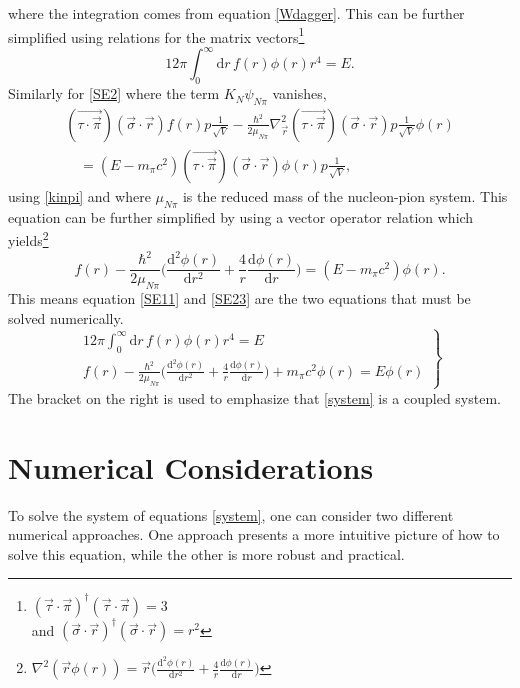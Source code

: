 where the integration comes from equation \eqref{Wdagger}. This can be further simplified using relations for the matrix vectors\footnote{$(\vec{\tau}\cdot \vec{\pi})^\dagger(\vec{\tau}\cdot \vec{\pi}) = 3$ \\ and
	$(\vec{\sigma}\cdot \vec{r})^\dagger(\vec{\sigma}\cdot \vec{r}) = r^2$}
\begin{equation} \label{SE11}
	12\pi \int_0^\infty  \text{d}r \, f(r) \phi(r) r^4  = E.
\end{equation}
Similarly for \eqref{SE2} where the term $K_{N}\psi_{N\pi}$ vanishes,
\begin{equation}\begin{split}\label{SE22}
		(\vec{\tau\cdot\vec{\pi}})(\vec{\sigma}\cdot\vec{r})f(r) p \frac{1}{\sqrt{V}}-\frac{\hbar^2}{2\mu_{N\pi}} \nabla^2_{\vec{r}}(\vec{\tau\cdot\vec{\pi}})(\vec{\sigma}\cdot\vec{r}) p \frac{1}{\sqrt{V}}\phi(r) \\ \quad= (E-m_\pi c^2) (\vec{\tau\cdot\vec{\pi}})(\vec{\sigma}\cdot\vec{r}) \phi(r)p\frac{1}{\sqrt{V}},
	\end{split}
\end{equation}
using \eqref{kinpi} and where $\mu_{N\pi}$ is the reduced mass of the nucleon-pion system. This equation can be further simplified by using a vector operator relation which yields\footnote{$\nabla^2(\vec{r}\phi(r))=\vec{r}\big(\frac{\text{d}^2\phi(r)}{\text{d}r^2}+\frac{4}{r}\frac{\text{d}\phi(r)}{\text{d}r}\big)$}
\begin{equation} \label{SE23}
	f(r) -\frac{\hbar^2}{2\mu_{N\pi}}\Big(\frac{\text{d}^2 \phi(r)}{\text{d}r^2}+\frac{4}{r}\frac{\text{d}\phi(r)}{\text{d}r}\Big) = (E-m_\pi c^2)\phi(r).
\end{equation}
This means equation \eqref{SE11} and \eqref{SE23} are the two equations that must be solved numerically.
\begin{equation} \label{system}
	\left.
	\begin{array}{ll}
		12\pi \int_0^\infty  \text{d}r \, f(r) \phi(r) r^4  = E \\
		f(r) -\frac{\hbar^2}{2\mu_{N\pi}}\Big(\frac{\text{d}^2 \phi(r)}{\text{d}r^2}+\frac{4}{r}\frac{\text{d}\phi(r)}{\text{d}r}\Big)+m_\pi c^2 \phi(r) = E\phi(r)
	\end{array}
	\right \} 
\end{equation}
The bracket on the right is used to emphasize that \eqref{system} is a coupled system.
\section{Numerical Considerations}\label{sec:numericalconsiderations}
To solve the system of equations \eqref{system}, one can consider two different numerical approaches. One approach presents a more intuitive picture of how to solve this equation, while the other is more robust and practical.

